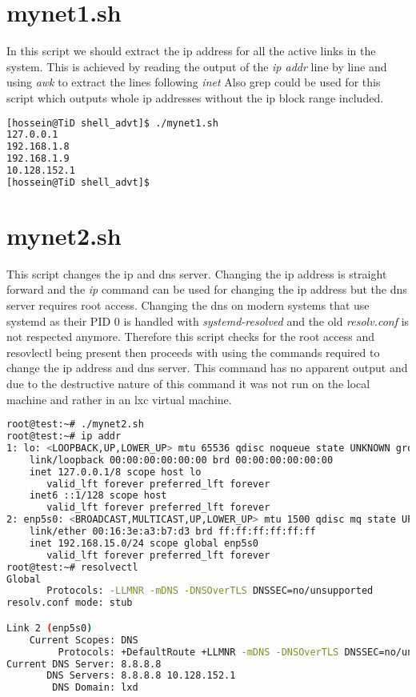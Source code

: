 \documentclass[a4paper, 11pt]{article}
\theoremstyle{nonumberplain}
\begin{document}
\section{mynet1.sh}
In this script we should extract the ip address for all the active links in
the system.
This is achieved by reading the output of the \textit{ip addr} line by line
and using \textit{awk} to extract the lines following \textit{inet}
Also grep could be used for this script which outputs whole ip addresses
without the ip block range included.

\begin{lstlisting}[language=bash]
[hossein@TiD shell_advt]$ ./mynet1.sh
127.0.0.1
192.168.1.8
192.168.1.9
10.128.152.1
[hossein@TiD shell_advt]$
\end{lstlisting}

\section{mynet2.sh}
This script changes the ip and dns server.
Changing the ip address is straight forward and the \textit{ip} command can
be used for changing the ip address but the dns server requires root access.
Changing the dns on modern systems that use systemd as their PID 0 is handled
with \textit{systemd-resolved} and the old \textit{resolv.conf} is not respected
anymore. Therefore this script checks for the root access and resovlectl being
present then proceeds with using the commands required to change the ip address
and dns server.
This command has no apparent output and due to the destructive nature of this
command it was not run on the local machine and rather in an lxc virtual
machine.

\begin{lstlisting}[language=bash]
root@test:~# ./mynet2.sh
root@test:~# ip addr
1: lo: <LOOPBACK,UP,LOWER_UP> mtu 65536 qdisc noqueue state UNKNOWN group default qlen 1000
    link/loopback 00:00:00:00:00:00 brd 00:00:00:00:00:00
    inet 127.0.0.1/8 scope host lo
       valid_lft forever preferred_lft forever
    inet6 ::1/128 scope host
       valid_lft forever preferred_lft forever
2: enp5s0: <BROADCAST,MULTICAST,UP,LOWER_UP> mtu 1500 qdisc mq state UP group default qlen 1000
    link/ether 00:16:3e:a3:b7:d3 brd ff:ff:ff:ff:ff:ff
    inet 192.168.15.0/24 scope global enp5s0
       valid_lft forever preferred_lft forever
root@test:~# resolvectl
Global
       Protocols: -LLMNR -mDNS -DNSOverTLS DNSSEC=no/unsupported
resolv.conf mode: stub

Link 2 (enp5s0)
    Current Scopes: DNS
         Protocols: +DefaultRoute +LLMNR -mDNS -DNSOverTLS DNSSEC=no/unsupported
Current DNS Server: 8.8.8.8
       DNS Servers: 8.8.8.8 10.128.152.1
        DNS Domain: lxd
\end{lstlisting}
\end{document}
